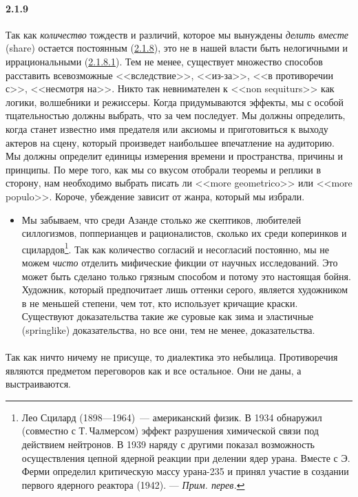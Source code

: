 \paragraph{2.1.9}\hypertarget{par:2.1.9}{} Так как {\itshape количество} тождеств и различий, которое мы вынуждены {\itshape делить вместе} (share) остается постоянным (\hyperlink{par:2.1.8}{2.1.8}), это не в нашей власти быть нелогичными и иррациональными (\hyperlink{par:2.1.8.1}{2.1.8.1}). Тем не менее, существует множество способов расставить всевозможные <<вследствие>>, <<из-за>>, <<в противоречии с>>, <<несмотря на>>. Никто так невнимателен к <<non sequiturs>> как логики, волшебники и режиссеры. Когда придумываются эффекты, мы с особой тщательностью должны выбрать, что за чем последует. Мы должны определить, когда станет известно имя предателя или аксиомы и приготовиться к выходу актеров на сцену, который произведет наибольшее впечатление на аудиторию. Мы должны определит единицы измерения времени и пространства, причины и принципы. По мере того, как мы со вкусом отобрали теоремы и реплики в сторону, нам необходимо выбрать писать ли <<more geometrico>> или <<more populo>>. Короче, убеждение зависит от жанра, который мы избрали.
	\begin{itemize}
	\item 
	Мы забываем, что среди Азанде столько же скептиков, любителей силлогизмов, попперианцев и рационалистов, сколько их среди коперинков и сцилардов\footnote{Лео Сцилард (1898---1964)~--- американский физик. В 1934 обнаружил (совместно с Т.\,Чалмерсом) эффект разрушения химической связи под действием нейтронов. В 1939 наряду с другими показал возможность осуществления цепной ядерной реакции при делении ядер урана. Вместе с Э.\,Ферми определил критическую массу урана-235 и принял участие в создании первого ядерного реактора (1942). --- {\itshape Прим. перев.}}. Так как количество согласий и несогласий постоянно, мы не можем {\itshape чисто} отделить мифические фикции от научных исследований. Это может быть сделано только грязным способом и потому это настоящая бойня. Художник, который предпочитает лишь оттенки серого, является художником в не меньшей степени, чем тот, кто использует кричащие краски. Существуют доказательства такие же суровые как зима и эластичные (springlike) доказательства, но все они, тем не менее, доказательства.
	\end{itemize}

\paragraph{}\hypertarget{par:}{} Так как ничто ничему не присуще, то диалектика это небылица. Противоречия являются предметом переговоров как и все остальное. Они не даны, а выстраиваются.

